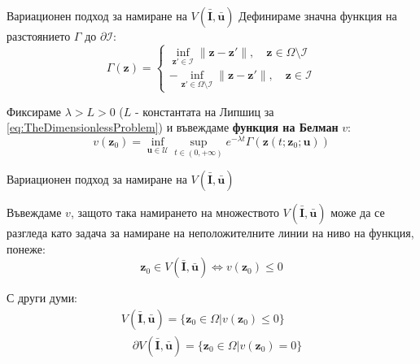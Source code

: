\begin{frame}[c]{Вариационен подход за намиране на $V(\bar{\boldsymbol{I}}, \bar{\boldsymbol{u}})$}
  Дефинираме значна функция на разстоянието $\Gamma$ до $\partial \mathcal{I}$:
  \begin{equation*}
    \Gamma(\boldsymbol{z}) =
    \begin{cases}
      \displaystyle\inf_{\boldsymbol{z}' \in \mathcal{I}} \|\boldsymbol{z}-\boldsymbol{z}'\|, \quad \boldsymbol{z} \in \Omega \setminus \mathcal{I} \\
      -\displaystyle\inf_{\boldsymbol{z}' \in \Omega \setminus \mathcal{I}} \|\boldsymbol{z}-\boldsymbol{z}'\|, \quad \boldsymbol{z} \in \mathcal{I}
    \end{cases}
  \end{equation*}

  Фиксираме $\lambda>L>0$ ($L$ - константата на Липшиц за \eqref{eq:TheDimensionlessProblem}) и въвеждаме \textbf{функция на Белман} $v$:
  \begin{equation*}
    v(\boldsymbol{z}_0) = \inf_{\boldsymbol{u} \in \mathcal{U}} \sup_{t \in (0, +\infty)} e^{-\lambda t} \Gamma(\boldsymbol{z}(t; \boldsymbol{z}_0; \boldsymbol{u}))
  \end{equation*}

\end{frame}

\begin{frame}[c]{Вариационен подход за намиране на $V(\bar{\boldsymbol{I}}, \bar{\boldsymbol{u}})$}

  Въвеждаме $v$, защото така намирането на множеството $V(\bar{\boldsymbol{I}}, \bar{\boldsymbol{u}})$ може да се разгледа като задача за намиране на неположителните линии на ниво на функция, понеже:
  \begin{equation*}
    \boldsymbol{z}_0 \in V(\bar{\boldsymbol{I}}, \bar{\boldsymbol{u}}) \iff v(\boldsymbol{z}_0) \leq 0
  \end{equation*}

  С други думи:
  \begin{equation*}
    \begin{split}
      V(\bar{\boldsymbol{I}}, \bar{\boldsymbol{u}}) = \{\boldsymbol{z}_0 \in \Omega \vert v(\boldsymbol{z}_0) \leq 0\}\\ \quad \partial V(\bar{\boldsymbol{I}}, \bar{\boldsymbol{u}}) = \{\boldsymbol{z}_0 \in \Omega \vert v(\boldsymbol{z}_0) = 0\}
    \end{split}
  \end{equation*}
\end{frame}


